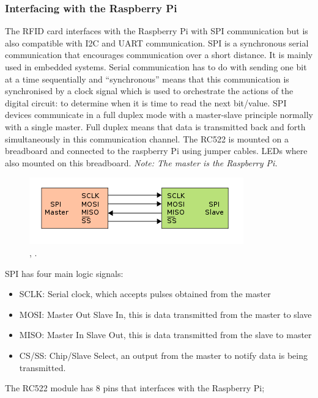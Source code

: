\subsubsection{Interfacing with the Raspberry Pi}
The \gls{RFID} card interfaces with the Raspberry Pi with \gls{SPI} communication but is also compatible with \gls{I2C} and \gls{UART} communication. \gls{SPI} is a synchronous serial communication that encourages communication over a short distance. It is mainly used in embedded systems. Serial communication has to do with sending one bit at a time sequentially and “synchronous” means that this communication is synchronised by a clock signal which is used to orchestrate the actions of the digital circuit: to determine when it is time to read the next bit/value. \gls{SPI} devices communicate in a full duplex mode with a master-slave principle normally with a single master. Full duplex means that data is transmitted back and forth simultaneously in this communication channel. The RC522 is mounted on a breadboard and connected to the raspberry Pi using jumper cables. LEDs where also mounted on this breadboard.
\textit{Note: The master is the Raspberry Pi.}
\vspace{1cm}
\begin{figure}[ht]
\centering
\includegraphics{Background/images/350px-SPI_single_slave.svg.png.png}
\caption{\citeauthor{FileSPIs48:online}, \citeyear{FileSPIs48:online}. }
\end{figure}
\vspace{1cm}
SPI has four main logic signals:
\begin{itemize}
\item SCLK: Serial clock, which accepts pulses obtained from the master
\item MOSI: Master Out Slave In, this is data transmitted from the master to slave
\item MISO: Master In Slave Out, this is data transmitted from the slave to master
\item CS/SS: Chip/Slave Select, an output from the master to notify data is being transmitted.
\end{itemize}
The RC522 module has 8 pins that interfaces with the Raspberry Pi;
